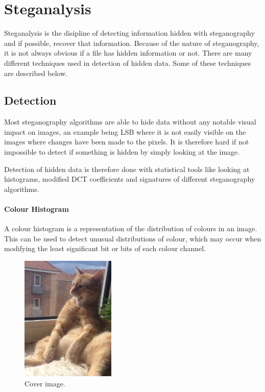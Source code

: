 \section{Steganalysis}
\label{steganalysis}
Steganalysis is the disipline of detecting information hidden with steganography and if possible, recover that information.
Because of the nature of steganography, it is not always obvious if a file has hidden information or not.
There are many different techniques used in detection of hidden data.
Some of these techniques are described below.


\subsection{Detection}
\label{Detection}
Most steganography algorithms are able to hide data without any notable visual impact on images, an example being LSB where it is not easily visible on the images where changes have been made to the pixels.
It is therefore hard if not impossible to detect if something is hidden by simply looking at the image.

Detection of hidden data is therefore done with statistical tools like looking at histograms, modified DCT coefficients and signatures of different steganography algorithms.

\paragraph*{Colour Histogram}
A colour histogram is a representation of the distribution of colours in an image. 
This can be used to detect unusual distributions of colour, which may occur when modifying the least significant bit or bits of each colour channel.

\begin{figure}
	\centering
	\includegraphics[width=0.4\textwidth]{figures/cover.jpg}
	\caption{Cover image.}
	\label{fig:CoverImage}
\end{figure}

